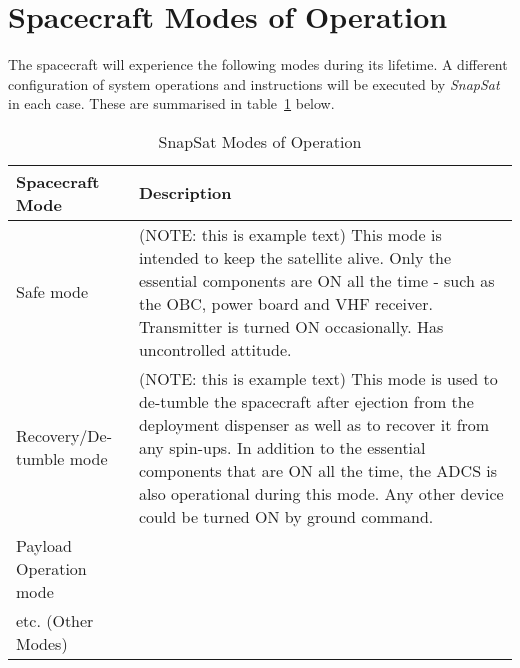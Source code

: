 \section{Spacecraft Modes of Operation}
The spacecraft will experience the following modes during its lifetime. A different configuration of system operations and instructions will be executed by \textit{SnapSat} in each case. These are summarised in table~\ref{tab:modesofoperation} below.

\begin{table}[H]
    \centering
    \caption{SnapSat Modes of Operation}
    \vspace{0.15cm}
    \label{tab:modesofoperation}
    {\renewcommand{\arraystretch}{1.4}%
        \begin{tabular}{|>{\arraybackslash}m{4.5cm}|>{\arraybackslash}m{10.5cm}|}
            \hline
            \textbf{Spacecraft Mode} & \textbf{Description} \\ \hline\hline
            Safe mode & (NOTE: this is example text) This mode is intended to keep the satellite alive. Only the essential components are ON all the time - such as the OBC, power board and VHF receiver. Transmitter is turned ON occasionally. 
            Has uncontrolled attitude. 
             \\\hline
            Recovery/De-tumble mode & (NOTE: this is example text) This mode is used to de-tumble the spacecraft after ejection from the deployment dispenser as well as to recover it from any spin-ups. In addition to the essential components that are ON all the time, the ADCS is also operational during this mode. Any other device could be turned ON by ground command.  \\\hline
            Payload Operation mode &   \\\hline
            etc. (Other Modes) &   \\\hline
        \end{tabular} } 
    \end{table}